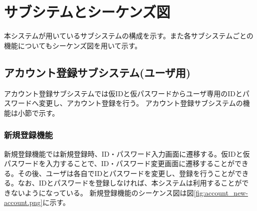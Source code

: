 \documentclass[a4j]{jarticle}
\begin{document}
    \section{サブシテムとシーケンズ図}
 本システムが用いているサブシステムの構成を示す。また各サブシステムごとの機能についてもシーケンズ図を用いて示す。
  \subsection{アカウント登録サブシステム(ユーザ用)}
アカウント登録サブシステムでは仮IDと仮パスワードからユーザ専用のIDとパスワードへ変更し、アカウント登録を行う。
アカウント登録サブシステムの機能は小節で示す。

\subsubsection{新規登録機能}
新規登録機能では新規登録時、ID・パスワード入力画面に遷移する。仮IDと仮パスワードを入力することで、ID・パスワード変更画面に遷移することができる。その後、ユーザは各自でIDとパスワードを変更し、登録を行うことができる。なお、IDとパスワードを登録しなければ、本システムは利用することができないようになっている。
新規登録機能のシーケンス図は図\ref{fig:account_new-account.png}に示す。
\end{document}
